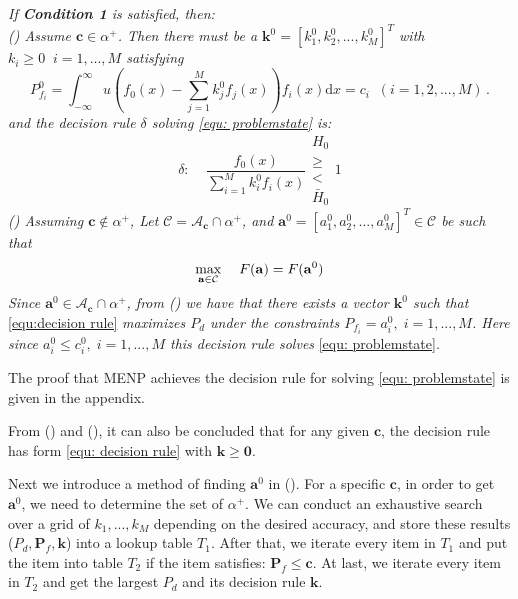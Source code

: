 \documentclass[12pt,journal,a4paper,twoside,onecolumn]{IEEEtran}
\newcommand{\rmnum}[1]{\romannumeral #1}
\begin{document}
\begin{spacing}{2.5}
\noindent \textit{
If \textnormal{\textbf{Condition 1}} is satisfied, then:
\\\textnormal{(\rmnum{1})} Assume $\mathbf{c} \in \alpha^+$. Then there must be a $\mathbf{k}^0 = [k_1^0, k_2^0, ..., k_M^0]^T$ with $k_i \geq 0\;\;i=1, ..., M$ satisfying
}
\begin{equation}
\label{equ:Pf}
  P_{f_i}^0 = \int_{-\infty}^{\infty} u(f_0(x) - \sum_{j=1}^{M}k_j^0f_j(x))f_i(x)\mathrm{d}x = c_i \;\; (i= 1, 2, ..., M)\,.
\end{equation}
\textit{
and the decision rule $\delta $ solving  \eqref{equ: problemstate} is:
}
\begin{equation}
\label{equ:decision rule}
\delta:\;\;\;\;\frac{f_0(x)}{\sum_{i=1}^{M}k_i^0f_i(x)} \substack{H_0 \\ \geq \\ < \\ \bar{H}_0} 1
\end{equation}
\textit{
\noindent \textnormal{(\rmnum{2})} Assuming $\mathbf{c} \notin \alpha^+$, Let $\mathcal{C} = \mathcal{A}_{\mathbf{c}} \cap \alpha^+$, and $\mathbf{a}^0 = [a_1^0, a_2^0, ..., a_M^0]^T \in \mathcal{C}$ be such that
}
\begin{equation}
\label{equ: F0}
\max_{\mathbf{a} \in \mathcal{C}}\;\;\;\;F(\mathbf{a}) = F(\mathbf{a}^0)\\
\end{equation}
\textit{
Since $\mathbf{a}^0 \in \mathcal{A}_{\mathbf{c}} \cap \alpha^+$, from \textnormal{(\rmnum{1})} we have that there exists a vector $\mathbf{k}^0$ such that}  \eqref{equ:decision rule} \textit{ maximizes $P_d$ under the constraints $P_{f_i} = a_i^0, \;i=1, ..., M$. Here since $a_i^0 \leq c_i^0, \;i=1, ..., M$ this decision rule  solves} \eqref{equ: problemstate}.

The proof that MENP achieves the decision rule for solving \eqref{equ: problemstate} is given in the appendix.

From (\rmnum{1}) and (\rmnum{2}), it can also be concluded that for any given $\mathbf{c}$, the decision rule has form  \eqref{equ: decision rule} with $\mathbf{k} \geq \mathbf{0}$.

Next we introduce a method of finding $\mathbf{a}^0$ in (\rmnum{2}). For a specific $\mathbf{c}$, in order to get $\mathbf{a}^0$, we need to determine the set of $\alpha^+$. We can conduct an exhaustive search over a grid of $k_1, ..., k_M$ depending on the desired accuracy, and store these results ($P_d, \mathbf{P}_f, \mathbf{k}$) into a lookup table $T_1$. After that, we iterate every item in $T_1$ and put the item into table $T_2$ if the item satisfies:  $\mathbf{P}_f \leq \mathbf{c}$.
At last, we iterate every item in $T_2$ and get the largest $P_d$ and its decision rule $\mathbf{k}$.


\end{spacing}
\end{document}
